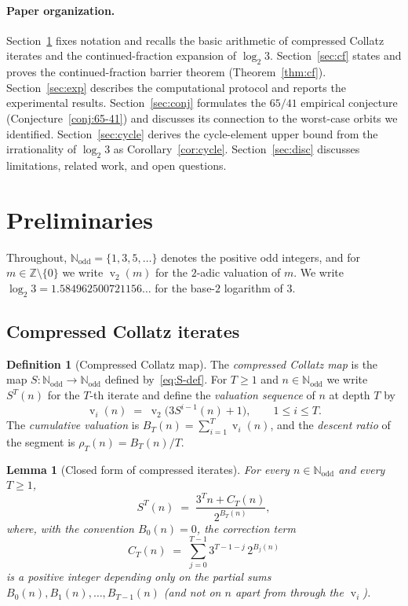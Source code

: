 \documentclass[11pt,a4paper]{article}
\newtheorem{lemma}[theorem]{Lemma}
\theoremstyle{definition}
\newtheorem{definition}[theorem]{Definition}
\theoremstyle{remark}
\DeclareMathOperator{\val}{v}
\newcommand{\N}{\mathbb{N}}
\newcommand{\Z}{\mathbb{Z}}
\newcommand{\Nodd}{\N_{\mathrm{odd}}}
\begin{document}
\paragraph{Paper organization.}
Section~\ref{sec:prelim} fixes notation and recalls the basic
arithmetic of compressed Collatz iterates and the continued-fraction
expansion of $\log_2 3$.  Section~\ref{sec:cf} states and proves the
continued-fraction barrier theorem (Theorem~\ref{thm:cf}).
Section~\ref{sec:exp} describes the computational protocol and
reports the experimental results.  Section~\ref{sec:conj} formulates
the $65/41$ empirical conjecture (Conjecture~\ref{conj:65-41}) and
discusses its connection to the worst-case orbits we identified.
Section~\ref{sec:cycle} derives the cycle-element upper bound from
the irrationality of $\log_2 3$ as Corollary~\ref{cor:cycle}.
Section~\ref{sec:disc} discusses limitations, related work, and open
questions.

\section{Preliminaries}\label{sec:prelim}

Throughout, $\Nodd = \{1, 3, 5, \ldots\}$ denotes the positive odd
integers, and for $m \in \Z \setminus \{0\}$ we write $\val_2(m)$ for
the $2$-adic valuation of $m$.  We write
$\log_2 3 = 1.584962500721156\ldots$ for the base-$2$ logarithm of
$3$.

\subsection{Compressed Collatz iterates}

\begin{definition}[Compressed Collatz map]\label{def:S}
The \emph{compressed Collatz map} is the map
$S \colon \Nodd \to \Nodd$ defined by~\eqref{eq:S-def}.  For
$T \geq 1$ and $n \in \Nodd$ we write $S^T(n)$ for the $T$-th iterate
and define the \emph{valuation sequence} of $n$ at depth $T$ by
\[
  \val_i(n) \;=\; \val_2\bigl(3 S^{i-1}(n) + 1\bigr),
  \qquad 1 \leq i \leq T.
\]
The \emph{cumulative valuation} is $B_T(n) = \sum_{i=1}^{T} \val_i(n)$,
and the \emph{descent ratio} of the segment is $\rho_T(n) = B_T(n)/T$.
\end{definition}

\begin{lemma}[Closed form of compressed iterates]\label{lem:closed}
For every $n \in \Nodd$ and every $T \geq 1$,
\begin{equation}\label{eq:STexp}
  S^T(n) \;=\; \frac{3^T n + C_T(n)}{2^{B_T(n)}},
\end{equation}
where, with the convention $B_0(n) = 0$, the correction term
\[
  C_T(n) \;=\; \sum_{j=0}^{T-1} 3^{T-1-j}\, 2^{B_j(n)}
\]
is a positive integer depending only on the partial sums
$B_0(n), B_1(n), \ldots, B_{T-1}(n)$ (and not on $n$ apart from through
the $\val_i$).
\end{lemma}
\end{document}

